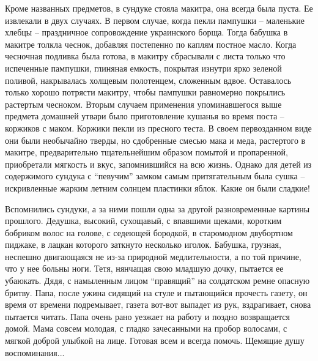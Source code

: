 Кроме названных предметов, в сундуке стояла макитра, она всегда была пуста. Ее
извлекали в двух случаях. В первом случае, когда пекли пампушки – маленькие
хлебцы – праздничное сопровождение украинского борща. Тогда бабушка в макитре
толкла чеснок, добавляя постепенно по каплям постное масло. Когда чесночная
подливка была готова, в макитру сбрасывали с листа только что испеченные
пампушки, глиняная емкость, покрытая изнутри ярко зеленой поливой, накрывалась
холщевым полотенцем, сложенным вдвое. Оставалось только хорошо потрясти
макитру, чтобы пампушки равномерно покрылись растертым чесноком. Вторым случаем
применения упоминавшегося выше предмета домашней утвари было приготовление
кушанья во время поста – коржиков с маком. Коржики пекли из пресного теста. В
своем первозданном виде они были необычайно тверды, но сдобренные смесью мака и
меда, растертого в макитре, предварительно тщательнейшим образом помытой и
пропаренной, приобретали мягкость и вкус, запомнившийся на всю жизнь. Однако
для детей из содержимого сундука с \enquote{певучим} замком самым притягательным была
сушка – искривленные жарким летним солнцем пластинки яблок. Какие он были
сладкие!

Вспомнились сундуки, а за ними пошли одна за другой разновременные картины
прошлого. Дедушка, высокий, сухощавый, с впавшими щеками, коротким бобриком
волос на голове, с седеющей бородкой, в старомодном двубортном пиджаке, в
лацкан которого заткнуто несколько иголок. Бабушка, грузная, неспешно
двигающаяся не из-за природной медлительности, а по той причине, что у нее
больны ноги. Тетя, нянчащая свою младшую дочку, пытается ее убаюкать. Дядя, с
намыленным лицом \enquote{правящий} на солдатском ремне опасную бритву. Папа, после
ужина сидящий на стуле и пытающийся прочесть газету, он время от времени
подремывает, газета вот-вот выпадет из рук, вздрагивает, снова пытается читать.
Папа очень рано уезжает на работу и поздно возвращается домой. Мама совсем
молодая, с гладко зачесанными на пробор волосами, с мягкой доброй улыбкой на
лице. Готовая всем и всегда помочь. Щемящие душу воспоминания...
